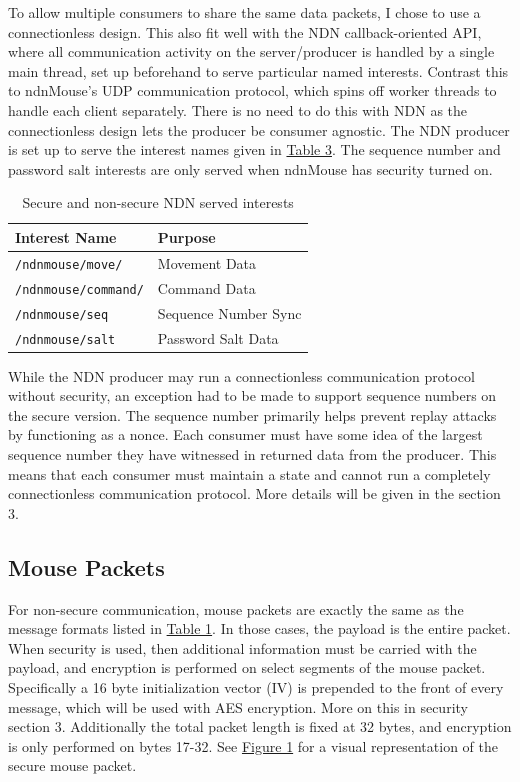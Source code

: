 \documentclass{sig-alternate}
\renewcommand\_{\textunderscore\allowbreak}  %
\begin{document}
To allow multiple consumers to share the same data packets, I chose to use a connectionless design. This also fit well with the NDN callback-oriented API, where all communication activity on the server/producer is handled by a single main thread, set up beforehand to serve particular named interests. Contrast this to ndnMouse's UDP communication protocol, which spins off worker threads to handle each client separately. There is no need to do this with NDN as the connectionless design lets the producer be consumer agnostic. The NDN producer is set up to serve the interest names given in \hyperlink{tab:ndnInterestNames}{Table 3}. The sequence number and password salt interests are only served when ndnMouse has security turned on.

\begin{table}
	\hypertarget{tab:ndnInterestNames}{}
	\begin{center}
		\begin{tabular}{| l | l |}
			\hline
			 Interest Name & Purpose \\ \hline\hline
			\texttt{/ndnmouse/move/} & Movement Data\\ \hline
			\texttt{/ndnmouse/command/} & Command Data\\ \hline
			\texttt{/ndnmouse/seq} & Sequence Number Sync\\ \hline
			\texttt{/ndnmouse/salt} & Password Salt Data\\ \hline
		\end{tabular}
		\caption{Secure and non-secure NDN served interests}
	\end{center}
\end{table}

While the NDN producer may run a connectionless communication protocol without security, an exception had to be made to support sequence numbers on the secure version. The sequence number primarily helps prevent replay attacks by functioning as a nonce. Each consumer must have some idea of the largest sequence number they have witnessed in returned data from the producer. This means that each consumer must maintain a state and cannot run a completely connectionless communication protocol. More details will be given in the section 3.

\subsection{Mouse Packets}
For non-secure communication, mouse packets are exactly the same as the message formats listed in \hyperlink{tab:msgFormat}{Table 1}. In those cases, the payload is the entire packet. When security is used, then additional information must be carried with the payload, and encryption is performed on select segments of the mouse packet. Specifically a 16 byte initialization vector (IV) is prepended to the front of every message, which will be used with AES encryption. More on this in security section 3. Additionally the total packet length is fixed at 32 bytes, and encryption is only performed on bytes 17-32. See \hyperlink{fig:mousePacketDescription}{Figure 1} for a visual representation of the secure mouse packet.
\end{document}

